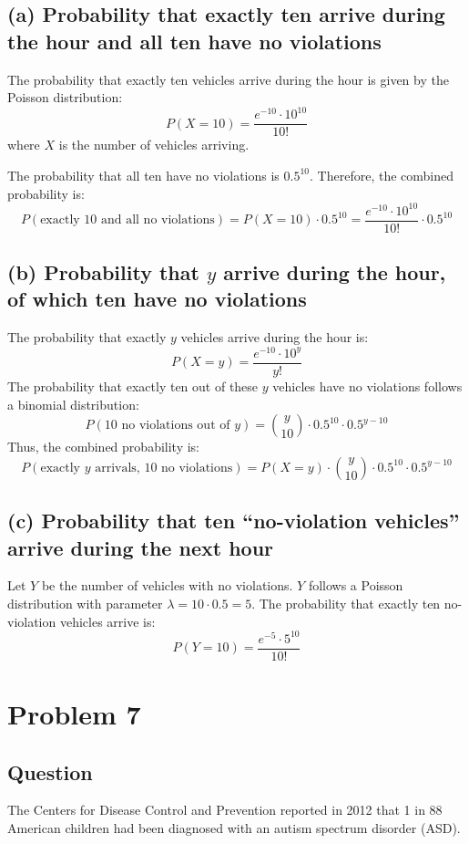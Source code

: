 \documentclass{article}
\begin{document}
\subsection*{(a) Probability that exactly ten arrive during the hour and all ten have no violations}

The probability that exactly ten vehicles arrive during the hour is given by the Poisson distribution:
\[
P(X = 10) = \frac{e^{-10} \cdot 10^{10}}{10!}
\]
where \(X\) is the number of vehicles arriving.

The probability that all ten have no violations is \(0.5^{10}\). Therefore, the combined probability is:
\[
P(\text{exactly 10 and all no violations}) = P(X = 10) \cdot 0.5^{10} = \frac{e^{-10} \cdot 10^{10}}{10!} \cdot 0.5^{10}
\]

\subsection*{(b) Probability that \(y\) arrive during the hour, of which ten have no violations}

The probability that exactly \(y\) vehicles arrive during the hour is:
\[
P(X = y) = \frac{e^{-10} \cdot 10^y}{y!}
\]
The probability that exactly ten out of these \(y\) vehicles have no violations follows a binomial distribution:
\[
P(\text{10 no violations out of } y) = \binom{y}{10} \cdot 0.5^{10} \cdot 0.5^{y-10}
\]
Thus, the combined probability is:
\[
P(\text{exactly } y \text{ arrivals, 10 no violations}) = P(X = y) \cdot \binom{y}{10} \cdot 0.5^{10} \cdot 0.5^{y-10}
\]

\subsection*{(c) Probability that ten “no-violation vehicles” arrive during the next hour}

Let \(Y\) be the number of vehicles with no violations. \(Y\) follows a Poisson distribution with parameter \(\lambda = 10 \cdot 0.5 = 5\). The probability that exactly ten no-violation vehicles arrive is:
\[
P(Y = 10) = \frac{e^{-5} \cdot 5^{10}}{10!}
\]
\section*{Problem 7}
\subsection*{Question}
The Centers for Disease Control and Prevention reported in 2012 that 1 in 88 American children had been diagnosed with an autism spectrum disorder (ASD).
\end{document}
